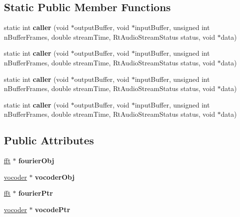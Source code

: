 \subsection*{Static Public Member Functions}
\begin{DoxyCompactItemize}
\item 
\hypertarget{classdispatch_a78e0b45ddb573d1b843ce02cd9092557}{static int {\bfseries caller} (void $\ast$output\-Buffer, void $\ast$input\-Buffer, unsigned int n\-Buffer\-Frames, double stream\-Time, Rt\-Audio\-Stream\-Status status, void $\ast$data)}\label{classdispatch_a78e0b45ddb573d1b843ce02cd9092557}

\item 
\hypertarget{classdispatch_a2bc93711c1aee895c430aece41ec026a}{static int {\bfseries caller} (void $\ast$output\-Buffer, void $\ast$input\-Buffer, unsigned int n\-Buffer\-Frames, double stream\-Time, Rt\-Audio\-Stream\-Status status, void $\ast$data)}\label{classdispatch_a2bc93711c1aee895c430aece41ec026a}

\item 
\hypertarget{classdispatch_a2bc93711c1aee895c430aece41ec026a}{static int {\bfseries caller} (void $\ast$output\-Buffer, void $\ast$input\-Buffer, unsigned int n\-Buffer\-Frames, double stream\-Time, Rt\-Audio\-Stream\-Status status, void $\ast$data)}\label{classdispatch_a2bc93711c1aee895c430aece41ec026a}

\item 
\hypertarget{classdispatch_a2bc93711c1aee895c430aece41ec026a}{static int {\bfseries caller} (void $\ast$output\-Buffer, void $\ast$input\-Buffer, unsigned int n\-Buffer\-Frames, double stream\-Time, Rt\-Audio\-Stream\-Status status, void $\ast$data)}\label{classdispatch_a2bc93711c1aee895c430aece41ec026a}

\end{DoxyCompactItemize}
\subsection*{Public Attributes}
\begin{DoxyCompactItemize}
\item 
\hypertarget{classdispatch_a7b449abb93c0499530bec56afe866f5a}{\hyperlink{classfft}{fft} $\ast$ {\bfseries fourier\-Obj}}\label{classdispatch_a7b449abb93c0499530bec56afe866f5a}

\item 
\hypertarget{classdispatch_a7ccec21b2dce1224744ccaa8d1cafee5}{\hyperlink{classvocoder}{vocoder} $\ast$ {\bfseries vocoder\-Obj}}\label{classdispatch_a7ccec21b2dce1224744ccaa8d1cafee5}

\item 
\hypertarget{classdispatch_a25afc54bd990f1169d9fa75dc304793b}{\hyperlink{classfft}{fft} $\ast$ {\bfseries fourier\-Ptr}}\label{classdispatch_a25afc54bd990f1169d9fa75dc304793b}

\item 
\hypertarget{classdispatch_adf89bdb854ef17a8927bf7c506bfdc23}{\hyperlink{classvocoder}{vocoder} $\ast$ {\bfseries vocode\-Ptr}}\label{classdispatch_adf89bdb854ef17a8927bf7c506bfdc23}

\end{DoxyCompactItemize}


